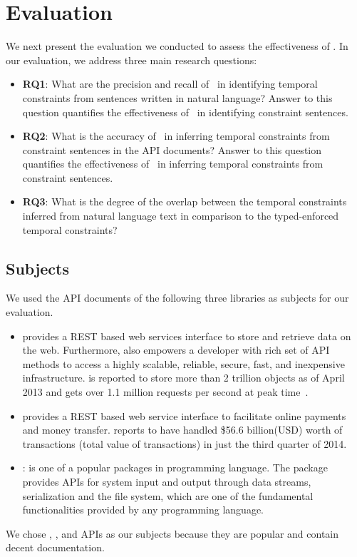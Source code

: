 \section{Evaluation}
\label{sec:evaluation}

We next present the evaluation we conducted to assess the effectiveness of \tool. In our evaluation, we address three main research questions:

\begin{itemize}
	\item\textbf{RQ1}: What are the precision and recall of \tool\ in identifying temporal constraints from sentences written in natural language?
	Answer to this question quantifies the effectiveness of \tool\ in identifying constraint sentences.
	\item\textbf{RQ2}: What is the accuracy of \tool\ in inferring temporal constraints from constraint sentences in the API documents?
	Answer to this question quantifies the effectiveness of \tool\ in inferring temporal constraints from constraint sentences. 
	\item\textbf{RQ3}: What is the degree of the overlap between the temporal constraints inferred from natural language text in comparison to the typed-enforced temporal constraints?
	
 
\end{itemize}

\subsection{Subjects}
\label{sub:subject}

We used the API documents of the following three libraries as subjects for our evaluation. 
\begin{itemize}
	\item \amazonAPI\: provides a REST based web services interface to store and retrieve data on the web.
	Furthermore,  also empowers a developer with rich set of API methods to access a highly scalable, reliable, secure, fast, and inexpensive infrastructure. 
	 is reported to store more than 2 trillion objects as of April 2013 and gets over 1.1 million requests per second at peak time~\cite{amazons3stats}.
	
	\item \paypalAPI\: provides a REST based web service interface to facilitate online payments and money transfer.
	 reports to have handled \$56.6 billion(USD) worth of transactions (total value of transactions) in just the third quarter of 2014. 
	
	\item{} : is one of a popular packages in  programming language. The package provides APIs for system input and output through data streams, serialization and the file system, which are one of the fundamental functionalities provided by any programming language.
\end{itemize}
We chose , , and  APIs as our subjects because they are popular and contain decent documentation.

